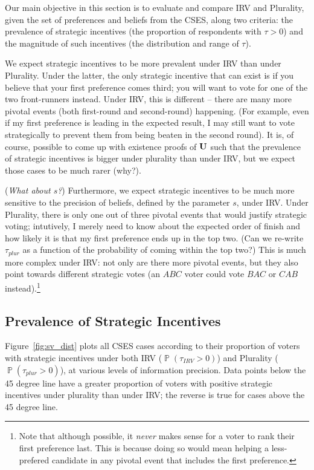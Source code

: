 \documentclass[11pt, letter]{article}
\DeclareMathOperator{\Prob}{\mathbb{P}}
\begin{document}
Our main objective in this section is to evaluate and compare IRV and Plurality, given the set of preferences and beliefs from the CSES, along two criteria: the prevalence of strategic incentives (the proportion of respondents with $\tau > 0$) and the magnitude of such incentives (the distribution and range of $\tau$). 

We expect strategic incentives to be more prevalent under IRV than under Plurality. Under the latter, the only strategic incentive that can exist is if you believe that your first preference comes third; you will want to vote for one of the two front-runners instead. Under IRV, this is different -- there are many more pivotal events (both first-round and second-round) happening. (For example, even if my first preference is leading in the expected result, I may still want to vote strategically to prevent them from being beaten in the second round). It is, of course, possible to come up with existence proofs of $
\bf U$ such that the prevalence of strategic incentives is bigger under plurality than under IRV, but we expect those cases to be much rarer (why?).

(\emph{What about $s$?}) Furthermore, we expect strategic incentives to be much more sensitive to the precision of beliefs, defined by the parameter $s$, under IRV. Under Plurality, there is only one out of three pivotal events that would justify strategic voting; intutively, I merely need to know about the expected order of finish and how likely it is that my first preference ends up in the top two. (Can we re-write $\tau_{plur}$ as a function of the probability of coming within the top two?) This is much more complex under IRV: not only are there more pivotal events, but they also point towards different strategic votes (an $ABC$ voter could vote $BAC$ or $CAB$ instead).\footnote{Note that although possible, it \emph{never} makes sense for a voter to rank their first preference last. This is because doing so would mean helping a less-prefered candidate in any pivotal event that includes the first preference.}

\subsection{Prevalence of Strategic Incentives}

Figure~\ref{fig:sv_dist} plots all CSES cases according to their proportion of voters with strategic incentives under both IRV ($\Prob(\tau_{IRV} > 0)$) and Plurality ($\Prob(\tau_{plur} > 0)$), at various levels of information precision. Data points below the 45 degree line have a greater proportion of voters with positive strategic incentives under plurality than under IRV; the reverse is true for cases above the 45 degree line.
\end{document}
